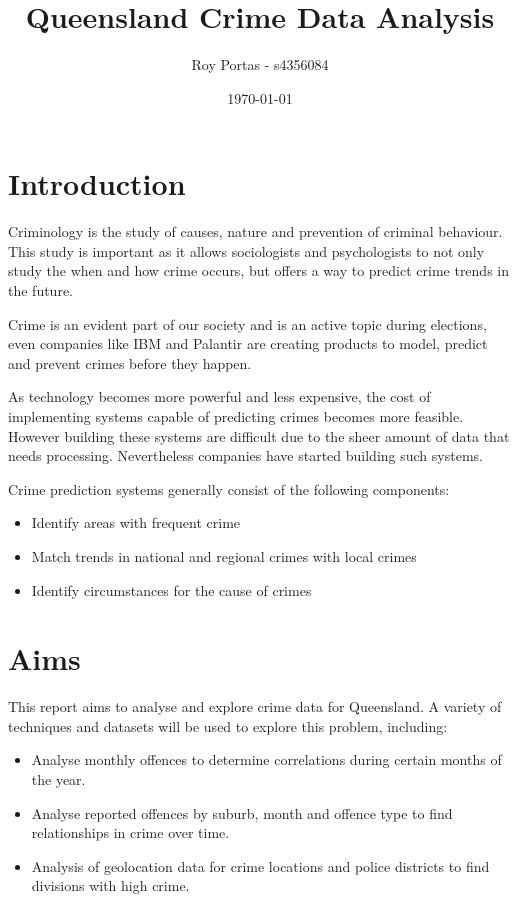 \documentclass[]{article}
\begin{document}
\title{Queensland Crime Data Analysis}
\author{Roy Portas - s4356084}
\date{\today}
\maketitle 
\section{Introduction}

Criminology is the study of causes, nature and prevention of criminal behaviour\cite{roufa_early_nodate}.
This study is important as it allows sociologists and psychologists to not only study the when and how crime occurs, but offers a way to predict crime trends in the future.

Crime is an evident part of our society and is an active topic during elections\cite{remeikis_queensland_2016}, even companies like IBM\cite{noauthor_ibm_2012} and Palantir\cite{palantir_technologies_law_nodate} 
are creating products to model, predict and prevent crimes before they happen.

As technology becomes more powerful and less expensive, the cost of implementing systems capable of predicting crimes becomes more feasible.
However building these systems are difficult due to the sheer amount of data that needs processing.
Nevertheless companies have started building such systems.

Crime prediction systems generally consist of the following components:
\begin{itemize}
    \item Identify areas with frequent crime\cite{noauthor_ibm_2012}
    \item Match trends in national and regional crimes with local crimes
    \item Identify circumstances for the cause of crimes\cite{noauthor_ibm_2012}
\end{itemize}

\section{Aims}

This report aims to analyse and explore crime data for Queensland. A variety of techniques and datasets will be used to explore this problem, including:

\begin{itemize}
    \item Analyse monthly offences to determine correlations during certain months of the year.
    \item Analyse reported offences by suburb, month and offence type to find relationships in crime over time.
    \item Analysis of geolocation data for crime locations and police districts to find divisions with high crime.
\end{itemize}
\end{document}
